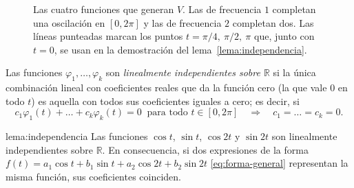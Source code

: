 \begin{figure}[H]
\centering
{}
\caption{Las cuatro funciones que generan $V$. Las de frecuencia $1$ completan una oscilación
en $[0,2\pi]$ y las de frecuencia $2$ completan dos. Las líneas punteadas marcan los puntos
$t=\pi/4,\ \pi/2,\ \pi$ que, junto con $t=0$, se usan en la demostración del
lema~\ref{lema:independencia}.}
\label{fig:generadoras}
\end{figure}

\begin{definicionT}
Las funciones $\varphi_1,\dots,\varphi_k$ son \emph{linealmente independientes sobre
$\mathbb R$} si la única combinación lineal con coeficientes reales que da la función cero (la
que vale $0$ en todo $t$) es aquella con todos sus coeficientes iguales a cero; es decir, si
\[
  c_1\varphi_1(t)+\dots+c_k\varphi_k(t)=0 \ \text{ para todo } t\in[0,2\pi]
  \quad\Longrightarrow\quad c_1=\dots=c_k=0 .
\]
\end{definicionT}

\begin{lemaT}{lema:independencia}
Las funciones $\cos t$, $\sin t$, $\cos 2t$ y $\sin 2t$ son linealmente independientes sobre
$\mathbb R$. En consecuencia, si dos expresiones de la forma $f(t)=a_1\cos t+b_1\sin t+a_2\cos 2t+b_2\sin 2t$ \eqref{eq:forma-general}
representan la misma función, sus coeficientes coinciden.
\end{lemaT}

